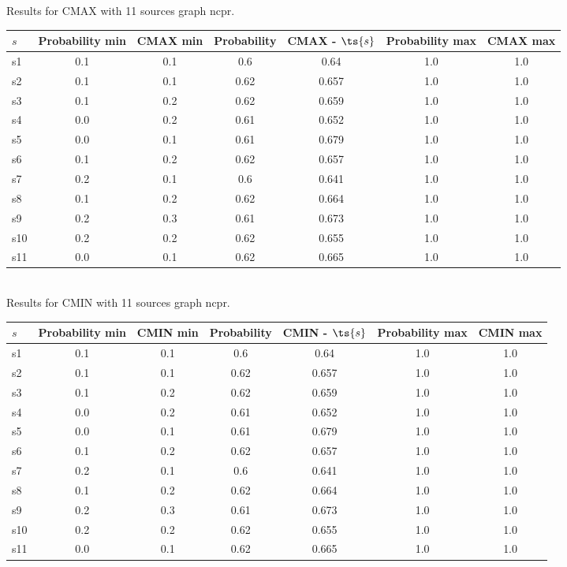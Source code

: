 \documentclass{article}
\begin{document}
\noindent Results for CMAX with 11 sources graph ncpr.

\noindent\begin{tabular}{|l|c|c|c|c|c|c|}
\hline
$s$& Probability min & CMAX min & Probability & CMAX - $\ts{s}$ & Probability max & CMAX max\\
\hline
s1 &0.1 & 0.1 & 0.6 & 0.64 & 1.0 & 1.0\\
\hline
s2 &0.1 & 0.1 & 0.62 & 0.657 & 1.0 & 1.0\\
\hline
s3 &0.1 & 0.2 & 0.62 & 0.659 & 1.0 & 1.0\\
\hline
s4 &0.0 & 0.2 & 0.61 & 0.652 & 1.0 & 1.0\\
\hline
s5 &0.0 & 0.1 & 0.61 & 0.679 & 1.0 & 1.0\\
\hline
s6 &0.1 & 0.2 & 0.62 & 0.657 & 1.0 & 1.0\\
\hline
s7 &0.2 & 0.1 & 0.6 & 0.641 & 1.0 & 1.0\\
\hline
s8 &0.1 & 0.2 & 0.62 & 0.664 & 1.0 & 1.0\\
\hline
s9 &0.2 & 0.3 & 0.61 & 0.673 & 1.0 & 1.0\\
\hline
s10 &0.2 & 0.2 & 0.62 & 0.655 & 1.0 & 1.0\\
\hline
s11 &0.0 & 0.1 & 0.62 & 0.665 & 1.0 & 1.0\\
\hline
\end{tabular}\\

\noindent Results for CMIN with 11 sources graph ncpr.

\noindent\begin{tabular}{|l|c|c|c|c|c|c|}
\hline
$s$& Probability min & CMIN min & Probability & CMIN - $\ts{s}$ & Probability max & CMIN max\\
\hline
s1 &0.1 & 0.1 & 0.6 & 0.64 & 1.0 & 1.0\\
\hline
s2 &0.1 & 0.1 & 0.62 & 0.657 & 1.0 & 1.0\\
\hline
s3 &0.1 & 0.2 & 0.62 & 0.659 & 1.0 & 1.0\\
\hline
s4 &0.0 & 0.2 & 0.61 & 0.652 & 1.0 & 1.0\\
\hline
s5 &0.0 & 0.1 & 0.61 & 0.679 & 1.0 & 1.0\\
\hline
s6 &0.1 & 0.2 & 0.62 & 0.657 & 1.0 & 1.0\\
\hline
s7 &0.2 & 0.1 & 0.6 & 0.641 & 1.0 & 1.0\\
\hline
s8 &0.1 & 0.2 & 0.62 & 0.664 & 1.0 & 1.0\\
\hline
s9 &0.2 & 0.3 & 0.61 & 0.673 & 1.0 & 1.0\\
\hline
s10 &0.2 & 0.2 & 0.62 & 0.655 & 1.0 & 1.0\\
\hline
s11 &0.0 & 0.1 & 0.62 & 0.665 & 1.0 & 1.0\\
\hline
\end{tabular}\\
\end{document}
